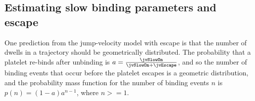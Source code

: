 
\subsection{Estimating slow binding parameters and escape}
\label{sec:estim-slow-bind}

One prediction from the jump-velocity model with escape is that the
number of dwells in a trajectory should be geometrically
distributed. The probability that a platelet re-binds after unbinding
is $a = \frac{\jvSlowOn}{\jvSlowOn + \jvEscape}$, and so the number of
binding events that occur before the platelet escapes is a geometric
distribution, and the probability mass function for the number of
binding events $n$ is $p(n) = (1 - a) a^{n - 1}$, where $n >= 1$.





